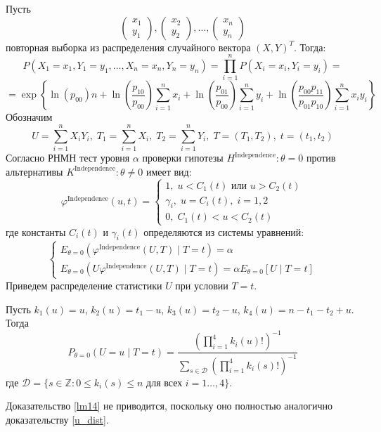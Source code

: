 Пусть
    $$
        \begin{pmatrix}
            x_1 \\
            y_1 
        \end{pmatrix},
        \begin{pmatrix}
            x_2 \\
            y_2
        \end{pmatrix}, \ldots,
        \begin{pmatrix}
            x_n \\
            y_n
        \end{pmatrix}
    $$ повторная выборка из распределения случайного вектора $(X,Y)^T$. Тогда:
$$
    P(X_1=x_1,Y_1=y_1,\ldots,X_n=x_n,Y_n=y_n)
    =\prod_{i=1}^n P(X_i=x_i,Y_i=y_i) =
    $$
    $$
    =\exp \left\{ \ln(p_{00})n + 
        \ln \left(\dfrac{p_{10}}{p_{00}}\right) \sum_{i=1}^n x_i 
        +\ln \left(\dfrac{p_{01}}{p_{00}}\right) \sum_{i=1}^{n} y_i   +
        \ln\left(\dfrac{p_{00}p_{11}}{p_{01}p_{10}}\right) \sum_{i=1}^n x_i y_i 
     \right\}
    $$
    Обозначим 
    $$
    U = \sum_{i=1}^n X_i Y_i,\;
    T_1 = \sum_{i=1}^n X_i,\;
    T_2 = \sum_{i=1}^n Y_i, \;
    T=(T_1,T_2), \; t=(t_1,t_2)$$
    Согласно \cite{Lehmann1986} РНМН тест уровня $\alpha$ проверки гипотезы $H^{\text{Independence}}: \theta = 0$ против альтернативы $K^{\text{Independence}}: \theta \neq 0$ 
    имеет вид:
    $$
    \varphi^{\text{Independence}}(u,t)=\begin{cases}
        1, \; u<C_1(t) \text{ или } u>C_2(t)\\
        \gamma_i, \; u=C_i(t), \; i=1,2\\
        0, \; C_1(t)<u<C_2(t)
    \end{cases}
    $$
    где константы $C_i(t)$ и $\gamma_i(t)$ определяются из системы уравнений:
    $$
    \begin{cases}
        E_{\theta=0}(\varphi^{\text{Independence}}(U,T) \mid T=t)=\alpha \\
        E_{\theta=0}(U\varphi^{\text{Independence}}(U,T) \mid T=t)=\alpha E_{\theta=0}[U \mid T=t]
    \end{cases}
    $$
    Приведем распределение статистики $U$ при условии $T=t$.
\begin{lemma}\label{lm14}
    Пусть $k_1(u)=u$, $k_2(u)=t_1-u$, $k_3(u)=t_2-u$,
    $k_4(u)=n-t_1-t_2+u$.
        Тогда
        $$P_{\theta=0}(U=u \mid T=t)=\dfrac{(\prod_{i=1}^4 k_i(u)!)^{-1}}
            {\sum_{s\in \mathcal{D}} (\prod_{i=1}^4 k_i(s)!)^{-1}}$$
        где $\mathcal{D}=\{s \in \mathbb{Z}: 0\leq k_i(s) \leq n \text{ для всех } i=1\ldots,4\}$.
\end{lemma}
Доказательство \autoref{lm14} не приводится, поскольку оно полностью 
аналогично доказательству \autoref{u_dist}.

